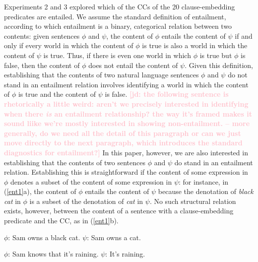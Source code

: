 \documentclass[11pt,fleqn]{article}
\newcommand{\jd}[1]{\textbf{\textcolor{Pink}{[jd: #1]}}}
\newcommand{\6}{\mbox{$[\hspace*{-.6mm}[$}}
\newcommand{\9}{\mbox{$]\hspace*{-.6mm}]$}}
\begin{document}
Experiments 2 and 3 explored which of the CCs of the 20 clause-embedding predicates are entailed. We assume the standard definition of entailment, according to which entailment is a binary, categorical relation between two contents: given sentences $\phi$ and $\psi$, the content of $\phi$ entails the content of $\psi$ if and only if every world in which the content of $\phi$ is true is also a world in which the content of $\psi$ is true. Thus, if there is even one world in which $\phi$ is true but $\phi$ is false, then the content of $\phi$ does not entail the content of $\psi$. Given this definition, establishing that the contents of two natural language sentences $\phi$ and $\psi$ do not stand in an entailment relation involves identifying a world in which the content of $\phi$ is true and the content of $\psi$ is false. \jd{the following sentence is rhetorically a little weird: aren't we precisely interested in identifying when there \emph{is} an entailment relationship? the way it's framed makes it sound liike we're mostly interested in showing non-entailment. -- more generally, do we need all the detail of this paragraph or can we just move directly to the next paragraph, which introduces the standard diagnostics for entailment?} In this paper, however, we are also interested in establishing that the contents of two sentences $\phi$ and $\psi$  do stand in an entailment relation. Establishing this is straightforward if the content of some expression in $\phi$ denotes a subset of the content of some expression in $\psi$: for instance, in (\ref{ent1}a),  the content of $\phi$ entails the content of $\psi$ because the denotation of {\em black cat} in $\phi$ is a subset of the denotation of {\em cat} in $\psi$. No such structural relation exists, however, between the content of a sentence with a clause-embedding predicate and the CC, as in (\ref{ent1}b). %

\begin{exe}
\ex\label{ent1}
\begin{xlist}
\ex $\phi$: Sam owns a black cat. \hspace*{1.5cm} $\psi$: Sam owns a cat.

\ex $\phi$: Sam knows that it's raining. \hspace*{.6cm} $\psi$: It's raining.

\end{xlist}
\end{exe}
\end{document}
